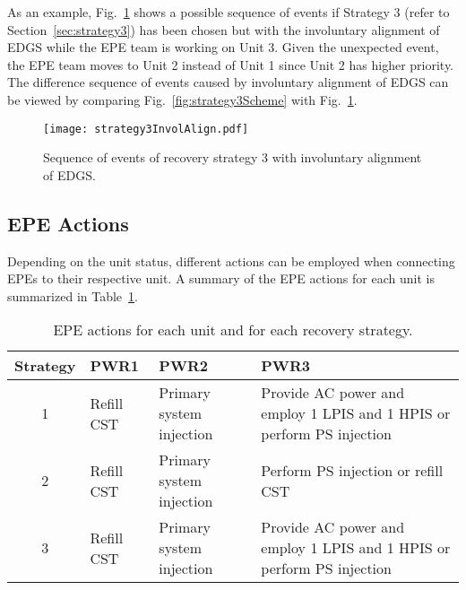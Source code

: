 As an example, Fig.~\ref{fig:strategy3SchemeInvolAlign} shows a possible sequence of events if Strategy 3 
(refer to Section~\ref{sec:strategy3}) has been chosen but with the involuntary alignment of EDGS while the EPE team
is working on Unit 3. Given the unexpected event, the EPE team moves to Unit 2 instead of Unit 1 since Unit 2
has higher priority. The difference sequence of events caused by involuntary alignment of EDGS can be viewed
by comparing Fig.~\ref{fig:strategy3Scheme} with Fig.~\ref{fig:strategy3SchemeInvolAlign}.

\begin{figure}
  \centering
  \centerline{\texttt{[image: strategy3InvolAlign.pdf]}}
  \caption{Sequence of events of recovery strategy 3 with involuntary alignment of EDGS.}
  \label{fig:strategy3SchemeInvolAlign}
\end{figure}

\subsection{EPE Actions}
\label{sec:EPEactions}

Depending on the unit status, different actions can be employed when connecting EPEs to their respective unit.
A summary of the EPE actions for each unit is summarized in Table~\ref{tab:EPEactions}. 

\begin{table}
  \begin{tabular}{|c|l|l|p{5cm}|}
     \hline
       \textbf{Strategy} &  \textbf{PWR1}       &  \textbf{PWR2}         &  \textbf{PWR3}    \\ 
       \hline \hline                                                              
       1        & Refill CST & Primary system injection & Provide AC power and employ 1 LPIS and 1 HPIS or perform PS injection  \\ \hline
       2        & Refill CST & Primary system injection & Perform PS injection or refill CST                                     \\ \hline
       3        & Refill CST & Primary system injection & Provide AC power and employ 1 LPIS and 1 HPIS or perform PS injection  \\ \hline
  \end{tabular}
  \caption{EPE actions for each unit and for each recovery strategy.}
  \label{tab:EPEactions}
\end{table} 

